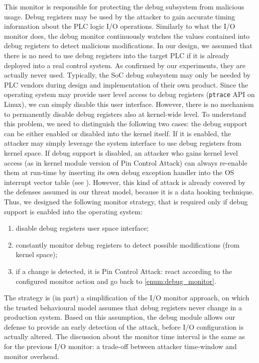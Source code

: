 This monitor is responsible for protecting the debug subsystem from malicious usage. Debug registers may be used by the attacker to gain accurate timing
information about the PLC logic I/O operations.
Similarly to what the I/O monitor does, the debug monitor continuously watches the values contained into debug registers to detect malicious modifications.
In our design, we assumed that there is no need to use debug registers into the target PLC if it is already deployed into a real control system.
As confirmed by our experiments, they are actually never used.
Typically, the SoC debug subsystem may only be needed by PLC vendors during design and implementation of their own product.
Since the operating system may provide user level access to debug registers (\eg \verb|ptrace| API on Linux), we can simply disable this user interface.
However, there is no mechanism to permanently disable debug registers also at kernel-wide level.
To understand this problem, we need to distinguish the following two cases: the debug support can be either enabled or disabled into the kernel itself.
If it is enabled, the attacker may simply leverage the system interface to use debug registers from kernel space.
If debug support is disabled, an attacker who gains kernel level access (as in kernel module version of Pin Control Attack) can always re-enable them at run-time
by inserting its own debug exception handler into the OS interrupt vector table (see \cite{arm-evt,x86-idt}).
However, this kind of attack is already covered by the defenses assumed in our threat model, because it is a data hooking technique.
Thus, we designed the following monitor strategy, that is required only if debug support is enabled into the operating system:
\begin{enumerate}
	\item disable debug registers user space interface;
	\item \label{enum:debug_monitor} constantly monitor debug registers to detect possible modifications (from kernel space);
	\item if a change is detected, it is Pin Control Attack: react according to the configured monitor action and go back to \ref{enum:debug_monitor}.
\end{enumerate}
The strategy is (in part) a simplification of the I/O monitor approach, on which the trusted behavioural model assumes that debug registers never change in a production system.
Based on this assumption, the debug module allows our defense to provide an early detection of the attack, before I/O configuration is actually altered.
The discussion about the monitor time interval is the same as for the previous I/O monitor: a trade-off between attacker time-window and monitor overhead.


